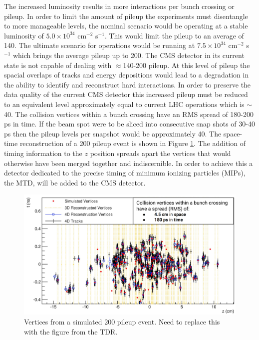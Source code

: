 The increased luminosity results in more interactions per bunch crossing or pileup.  In order to limit the amount of pileup the experiments must disentangle to more manageable levels, the nominal scenario would be operating at a stable luminosity of $5.0\times10^{34}$ cm$^{-2}$ s$^{-1}$.  This would limit the pileup to an average of 140.  The ultimate scenario for operations would be running at $7.5\times10^{34}$ cm$^{-2}$ s$^{-1}$ which brings the average pileup up to 200.  The CMS detector in its current state is not capable of dealing with $\approx$140-200 pileup.  At this level of pileup the spacial overlaps of tracks and energy depositions would lead to a degradation in the ability to identify and reconstruct hard interactions. In order to preserve the data quality of the current CMS detector this increased pileup must be reduced to an equivalent level approximately equal to current LHC operations which is $\sim$40.  The collision vertices within a bunch crossing have an RMS spread of 180-200 ps in time.  If the beam spot were to be sliced into consecutive snap shots of 30-40 ps then the pileup levels per snapshot would be approximately 40.  The space-time reconstruction of a 200 pileup event is shown in Figure \ref{fig:pileup4d}.  The addition of timing information to the $z$ position spreads apart the vertices that would otherwise have been merged together and indiscernible.  In order to achieve this a detector dedicated to the precise timing of minimum ionizing particles (MIPs), the MTD, will be added to the CMS detector.



\begin{figure}[h]
	\centering
	\includegraphics[width=0.7\linewidth]{Figures/Pileup_4D}
	\caption{Vertices from a simulated 200 pileup event.  Need to replace this with the figure from the TDR. }
	\label{fig:pileup4d}
\end{figure}






